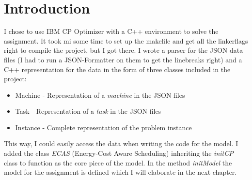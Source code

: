 \section{Introduction}

I chose to use IBM CP Optimizer with a C++ environment to solve the assignment. It took mi some time 
to set up the makefile and get all the linkerflags right to compile the project, but I got there. I wrote
a parser for the JSON data files (I had to run a JSON-Formatter on them to get the linebreaks right) and a C++ representation for the data in the form of three classes included in the project: 

\begin{itemize}
	\item Machine - Representation of a \textit{machine} in the JSON files
	\item Task - Representation of a \textit{task} in the JSON files
	\item Instance - Complete representation of the problem instance
\end{itemize}

This way, I could easily access the data when writing the code for the model. I added the class \textit{ECAS} (Energy-Cost Aware Scheduling) inheriting the \textit{initCP} class to function as the core piece of the model. In the method \textit{initModel} the model for the assignment is defined which I will elaborate in the next chapter.
